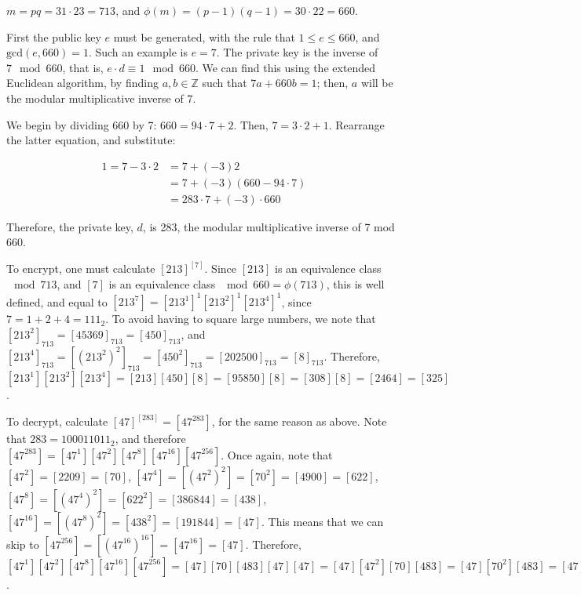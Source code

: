 
$m = pq = 31 \cdot 23 = 713$, and $\phi(m) = (p - 1)(q - 1) = 30 \cdot 22 = 660$.

First the public key $e$ must be generated, with the rule that $1 \leq e \leq 660$, and $\text{gcd}(e, 660) = 1$. Such an example is $e = 7$. The private key is the inverse of $7 \mod 660$, that is, $e \cdot d \equiv 1 \mod 660$. We can find this using the extended Euclidean algorithm, by finding $a, b \in \mathbb{Z}$ such that $7a + 660b = 1$; then, $a$ will be the modular multiplicative inverse of 7.

We begin by dividing 660 by 7: $660 = 94 \cdot 7 + 2$. Then, $7 = 3 \cdot 2 + 1$. Rearrange the latter equation, and substitute:

\begin{align*}
  1 = 7 - 3 \cdot 2 &= 7 + (-3)2 \\
  &= 7 + (-3)(660 - 94 \cdot 7) \\
  &= 283 \cdot 7 + (-3) \cdot 660
\end{align*}

Therefore, the private key, $d$, is 283, the modular multiplicative inverse of 7 mod 660.

To encrypt, one must calculate $[213]^{[7]}$. Since $[213]$ is an equivalence class $\mod 713$, and $[7]$ is an equivalence class $\mod 660 = \phi(713)$, this is well defined, and equal to $[213^7] = [213^1]^1[213^2]^1[213^4]^1$, since $7 = 1 + 2 + 4 = 111_2$. To avoid having to square large numbers, we note that $[213^2]_{713} = [45369]_{713} = [450]_{713}$, and $[213^4]_{713} = [(213^2)^2]_{713} = [450^2]_{713} = [202500]_{713} = [8]_{713}$. Therefore, $[213^1][213^2][213^4] = [213][450][8] = [95850][8] = [308][8] = [2464] = [325]$.

To decrypt, calculate $[47]^{[283]} = [47^{283}]$, for the same reason as above. Note that $283 = 100011011_2$, and therefore $[47^{283}] = [47^1][47^2][47^8][47^{16}][47^{256}]$. Once again, note that $[47^2] = [2209] = [70]$, $[47^4] = [(47^2)^2] = [70^2] = [4900] = [622]$, $[47^8] = [(47^4)^2] = [622^2] = [386844] = [438]$, $[47^16] = [(47^8)^2] = [438^2] = [191844] = [47]$. This means that we can skip to $[47^{256}] = [(47^{16})^{16}] = [47^{16}] = [47]$. Therefore, $[47^1][47^2][47^8][47^{16}][47^{256}] = [47][70][483][47][47] = [47][47^2][70][483] = [47][70^2][483] = [47][622][483] = [47][253] = [483]$.


